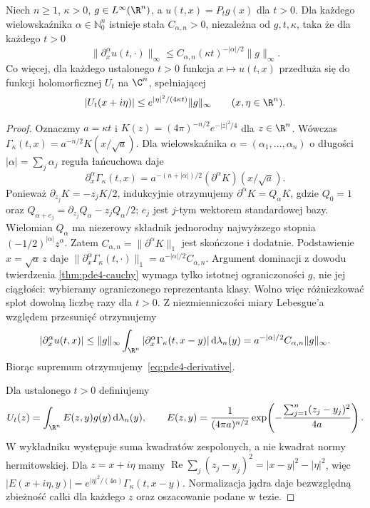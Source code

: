 \begin{twierdzenie}
\label{thm:pde4-smoothing}
Niech $n\geq1$, $\kappa>0$, $g\in L^\infty(\R^n)$,
a $u(t,x)=P_tg(x)$ dla $t>0$.
Dla każdego wielowskaźnika $\alpha\in\mathbb N_0^n$
istnieje stała $C_{\alpha,n}>0$, niezależna od
$g,t,\kappa$, taka że dla każdego $t>0$
\begin{equation}\label{eq:pde4-derivative}
 \|\partial_x^\alpha u(t,\cdot)\|_\infty
 \leq C_{\alpha,n}(\kappa t)^{-|\alpha|/2}\|g\|_\infty.
\end{equation}
Co więcej, dla każdego ustalonego $t>0$ funkcja
$x\mapsto u(t,x)$ przedłuża się do funkcji holomorficznej
$U_t$ na $\C^n$, spełniającej
\[
 |U_t(x+i\eta)|\leq
 e^{|\eta|^2/(4\kappa t)}\|g\|_\infty
 \qquad(x,\eta\in\R^n).
\]
\end{twierdzenie}
\begin{proof}
Oznaczmy $a=\kappa t$ i $K(z)=(4\pi)^{-n/2}e^{-|z|^2/4}$
dla $z\in\R^n$. Wówczas $\Gamma_\kappa(t,x)=a^{-n/2}K(x/\sqrt a)$.
Dla wielowskaźnika $\alpha=(\alpha_1,\ldots,\alpha_n)$
o długości $|\alpha|=\sum_j\alpha_j$ reguła łańcuchowa daje
\[
 \partial_x^\alpha\Gamma_\kappa(t,x)
 =a^{-(n+|\alpha|)/2}(\partial^\alpha K)(x/\sqrt a).
\]
Ponieważ $\partial_{z_j}K=-z_jK/2$, indukcyjnie otrzymujemy
$\partial^\alpha K=Q_\alpha K$, gdzie $Q_0=1$ oraz
$Q_{\alpha+e_j}=\partial_{z_j}Q_\alpha-z_jQ_\alpha/2$;
$e_j$ jest $j$-tym wektorem standardowej bazy.
Wielomian $Q_\alpha$ ma niezerowy składnik jednorodny
najwyższego stopnia $(-1/2)^{|\alpha|}z^\alpha$.
Zatem $C_{\alpha,n}=\|\partial^\alpha K\|_1$ jest
skończone i dodatnie. Podstawienie $x=\sqrt a\,z$
daje $\|\partial_x^\alpha\Gamma_\kappa(t,\cdot)\|_1
=a^{-|\alpha|/2}C_{\alpha,n}$.
Argument dominacji z dowodu twierdzenia
\ref{thm:pde4-cauchy} wymaga tylko istotnej
ograniczoności $g$, nie jej ciągłości: wybieramy
ograniczonego reprezentanta klasy. Wolno więc
różniczkować splot dowolną liczbę razy dla $t>0$.
Z niezmienniczości miary Lebesgue'a względem przesunięć
otrzymujemy
\[
 |\partial_x^\alpha u(t,x)|
 \leq\|g\|_\infty\int_{\R^n}
 |\partial_x^\alpha\Gamma_\kappa(t,x-y)|\,\mathrm d\lambda_n(y)
 =a^{-|\alpha|/2}C_{\alpha,n}\|g\|_\infty.
\]
Biorąc supremum otrzymujemy~\eqref{eq:pde4-derivative}.

Dla ustalonego $t>0$ definiujemy
\[
 U_t(z)=\int_{\R^n}E(z,y)g(y)\,\mathrm d\lambda_n(y),
 \qquad
 E(z,y)=\frac1{(4\pi a)^{n/2}}
 \exp\!\left(-\frac{\sum_{j=1}^n(z_j-y_j)^2}{4a}\right).
\]
W wykładniku występuje suma kwadratów zespolonych,
a nie kwadrat normy hermitowskiej. Dla $z=x+i\eta$
mamy $\operatorname{Re}\sum_j(z_j-y_j)^2=|x-y|^2-|\eta|^2$,
więc $|E(x+i\eta,y)|=e^{|\eta|^2/(4a)}\Gamma_\kappa(t,x-y)$.
Normalizacja jądra daje bezwzględną zbieżność
całki dla każdego $z$ oraz oszacowanie podane w tezie.


\end{proof}
